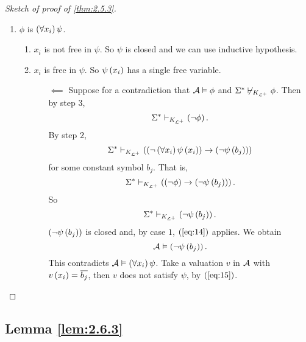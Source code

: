 \begin{proof}[Sketch of proof of \ref{thm:2.5.3}]
\begin{enumerate}[leftmargin=0.5in, label=Step \arabic*.]
\begin{itemize}
\begin{enumerate}[leftmargin=0.5in, label=Case \arabic*.]
\item $ \phi $ is $ \fab{x_i}\psi $.
\begin{enumerate}[leftmargin=0.5in, label=Case 3\alph*.]
\item $ x_i $ is not free in $ \psi $. So $ \psi $ is closed and we can use inductive hypothesis.
\item $ x_i $ is free in $ \psi $. So $ \psi\rb{x_i} $ has a single free variable.
\begin{itemize}
\item[$ \impliedby $] Suppose for a contradiction that $ \AA \vDash \phi $ and $ \Sigma^* \not\vdash_{K_{\LL^+}} \phi $. Then by step $ 3 $,
$$ \Sigma^* \vdash_{K_{\LL^+}} \notb{\phi}. $$
By step $ 2 $,
$$ \Sigma^* \vdash_{K_{\LL^+}} \impb{\notb{\fab{x_i}\psi\rb{x_i}}}{\notb{\psi\rb{b_j}}} $$
for some constant symbol $ b_j $. That is,
$$ \Sigma^* \vdash_{K_{\LL^+}} \impb{\notb{\phi}}{\notb{\psi\rb{b_j}}}. $$
So
$$ \Sigma^* \vdash_{K_{\LL^+}} \notb{\psi\rb{b_j}}. $$
$ \notb{\psi\rb{b_j}} $ is closed and, by case $ 1 $, $ \rb{\ref{eq:14}} $ applies. We obtain
\begin{equation}
\label{eq:15}
\AA \vDash \notb{\psi\rb{b_j}}.
\end{equation}
This contradicts $ \AA \vDash \fab{x_i}\psi $. Take a valuation $ v $ in $ \AA $ with $ v\rb{x_i} = \overline{b_j} $, then $ v $ does not satisfy $ \psi $, by $ \rb{\ref{eq:15}} $.
\end{itemize}
\end{enumerate}
\end{enumerate}
\end{itemize}
\end{enumerate}
\end{proof}

\pagebreak

\subsection{Lemma \ref{lem:2.6.3}}

